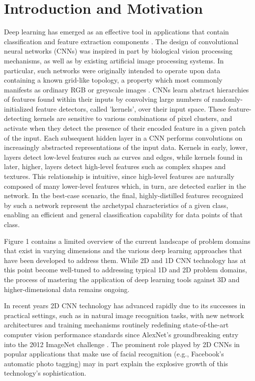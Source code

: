 \documentclass{article}
\begin{document}
\section{Introduction and Motivation}

Deep learning has emerged as an effective tool in applications that contain classification and feature extraction components \cite{lecun15}. The design of convolutional neural networks (CNNs) was inspired in part by biological vision processing mechanisms, as well as by existing artificial image processing systems. In particular, such networks were originally intended to operate upon data containing a known grid-like topology, a property which most commonly manifests as ordinary RGB or greyscale images \cite{Goodfellow-et-al-2016}. CNNs learn abstract hierarchies of features found within their inputs by convolving large numbers of randomly-initialized feature detectors, called 'kernels', over their input space. These feature-detecting kernels are sensitive to various combinations of pixel clusters, and activate when they detect the presence of their encoded feature in a given patch of the input. Each subsequent hidden layer in a CNN performs convolutions on increasingly abstracted representations of the input data. Kernels in early, lower, layers detect low-level features such as curves and edges, while kernels found in later, higher, layers detect high-level features such as complex shapes and textures. This relationship is intuitive, since high-level features are naturally composed of many lower-level features which, in turn, are detected earlier in the network. In the best-case scenario, the final, highly-distilled features recognized by such a network represent the archetypal characteristics of a given class, enabling an efficient and general classification capability for data points of that class.

Figure 1 contains a limited overview of the current landscape of problem domains that exist in varying dimensions and the various deep learning approaches that have been developed to address them. While 2D and 1D CNN technology has at this point become well-tuned to addressing typical 1D and 2D problem domains, the process of mastering the application of deep learning tools against 3D and higher-dimensional data remains ongoing. 

In recent years 2D CNN technology has advanced rapidly due to its successes in practical settings, such as in natural image recognition tasks, with new network architectures and training mechanisms routinely redefining state-of-the-art computer vision performance standards since AlexNet's groundbreaking entry into the 2012 ImageNet challenge \cite{krizhevsky2012imagenet}. The prominent role played by 2D CNNs in popular applications that make use of facial recognition (e.g., Facebook's automatic photo tagging) may in part explain the explosive growth of this technology's sophistication.
\end{document}
